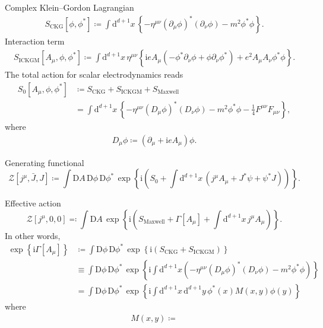 \documentclass[12pt]{article}
\newcommand\mi{\mathrm{i}} %
\newcommand\dif{\mathrm{d}}
\newcommand\Dif{\mathrm{D}}
\newcommand{\rbr}[1]{{\left(#1\right)}}
\newcommand{\cbr}[1]{{\left\{#1\right\}}}
\newcommand{\rfun}[2]{{#1}\mathopen{}\left(#2\right)\mathclose{}}
\newcommand{\sfun}[2]{{#1}\mathopen{}\left[#2\right]\mathclose{}}
\newcommand{\cfun}[2]{{#1}\mathopen{}\left\{#2\right\}\mathclose{}}
\begin{document}
Complex Klein--Gordon Lagrangian
\begin{align}
\sfun{S_\text{CKG}}{\phi,\phi^*}\coloneqq\int\dif^{d+1}x\,\cbr{-\eta^{\mu\nu}
\rbr{\partial_\mu\phi}^* \rbr{\partial_\nu\phi} - m^2\phi^*\phi}.
\end{align}
Interaction term
\begin{align}
\sfun{S_\text{ICKGM}}{A_\mu,\phi,\phi^*} \coloneqq \int\dif^{d+1}x\,
\eta^{\mu\nu}{}
\cbr{\mi e A_\mu \rbr{-\phi^*\partial_\nu\phi+\phi\partial_\nu\phi^*}
+e^2 A_\mu A_\nu \phi^* \phi}.
\end{align}
The total action for scalar electrodynamics reads
\begin{align}
\sfun{S_0}{A_\mu, \phi, \phi^*} &\coloneqq 
S_\text{CKG} + S_\text{ICKGM} + S_\text{Maxwell} \nonumber \\
&= \int\dif^{d+1}x\,\cbr{-\eta^{\mu\nu}
\rbr{D_\mu\phi}^* \rbr{D_\nu\phi} - m^2\phi^*\phi
-\frac{1}{4}F^{\mu\nu}F_{\mu\nu}},
\end{align}
where
\begin{align}
D_\mu\phi \coloneqq \rbr{\partial_\mu+\mi e A_\mu}\phi.
\end{align}

Generating functional
\begin{equation}
\sfun{\mathcal{Z}}{j^\mu, \bar J, J} \coloneqq
\int\Dif A\,\Dif\phi\,\Dif\phi^*\,\cfun{\exp}{\mi\rbr{S_0
+\int\dif^{d+1} x\,\rbr{j^\mu A_\mu + J^* \psi+\psi^* J}}}.
\end{equation}

Effective action
\begin{equation}
\sfun{\mathcal{Z}}{j^\mu, 0, 0} \eqqcolon
\int\Dif A\,\cfun{\exp}{\mi\rbr{S_\text{Maxwell} + 
\sfun{\varGamma}{A_\mu}
+\int\dif^{d+1} x \,j^\mu A_\mu}}.
\end{equation}
In other words,
\begin{align}
\cfun{\exp}{\mi\sfun{\varGamma}{A_\mu}} &\coloneqq \int\Dif\phi\,\Dif\phi^*\,
\cfun{\exp}{\mi\rbr{S_\text{CKG}+S_\text{ICKGM}}}
\nonumber \\
&\equiv \int\Dif\phi\,\Dif\phi^*\,
\cfun{\exp}{\mi\int\dif^{d+1} x
\rbr{-\eta^{\mu\nu}
\rbr{D_\mu\phi}^* \rbr{D_\nu\phi} - m^2\phi^*\phi}}
\nonumber \\
&= \int\Dif\phi\,\Dif\phi^*\,
\cfun{\exp}{\mi\int\dif^{d+1} x\,\dif^{d+1} y\,
\rfun{\phi^*}{x} \rfun{M}{x, y} \rfun{\phi}{y}}
\end{align}
where
\begin{align}
\rfun{M}{x, y} \coloneqq
\end{align}
\end{document}
